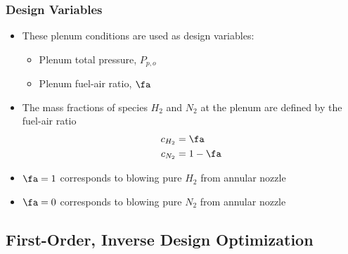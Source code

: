 \documentclass{beamer}
\begin{document}
\begin{frame}
  \frametitle{Design Variables}
  \begin{itemize}
    \item These plenum conditions are used as design variables:
      \begin{itemize}
        \item Plenum total pressure, $P_{p,o}$
        \item Plenum fuel-air ratio, $\fa$
      \end{itemize}
    \item The mass fractions of species $H_2$ and $N_2$ at the plenum are
      defined by the fuel-air ratio
\begin{equation*}
  \begin{aligned}
    c_{H_2} &= \fa \\
    c_{N_2} &= 1 - \fa
  \end{aligned}
\end{equation*}
  \item $\fa = 1$ corresponds to blowing pure $H_2$ from annular nozzle
  \item $\fa = 0$ corresponds to blowing pure $N_2$ from annular nozzle
  \end{itemize}
\end{frame}

\subsection{First-Order, Inverse Design Optimization}
\end{document}
